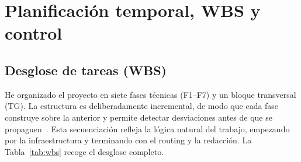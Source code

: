 \section{Planificación temporal, WBS y control}
\label{sec:planificacion-wbs-control}

\subsection{Desglose de tareas (WBS)}

He organizado el proyecto en siete fases técnicas (F1--F7) y un bloque transversal (TG). La estructura es deliberadamente incremental, de modo que cada fase construye sobre la anterior y permite detectar desviaciones antes de que se propaguen~\cite{gpi}. Esta secuenciación refleja la lógica natural del trabajo, empezando por la infraestructura y terminando con el routing y la redacción. La Tabla~\ref{tab:wbs} recoge el desglose completo.

